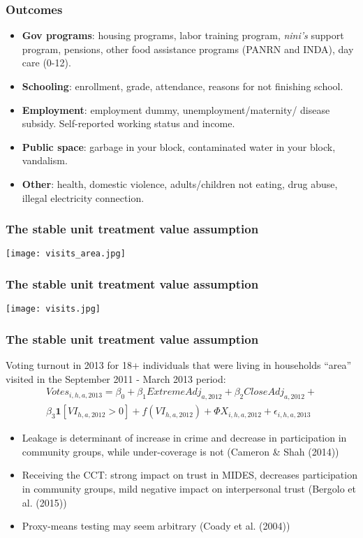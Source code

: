 \documentclass{beamer}
\begin{document}
\begin{frame}
\frametitle{Outcomes}
\begin{itemize}
	\item \textbf{Gov programs}: housing programs, labor training program, \textit{nini's} support program, pensions, other food assistance programs (PANRN and INDA), day care (0-12).
	\item \textbf{Schooling}: enrollment, grade, attendance, reasons for not finishing school. 	 
	\item \textbf{Employment}: employment dummy, unemployment/maternity/ disease subsidy. Self-reported working status and income.
	\item \textbf{Public space}: garbage in your block, contaminated water in your block, vandalism.
	\item \textbf{Other}: health, domestic violence, adults/children not eating, drug abuse, illegal electricity connection.
\end{itemize}
\end{frame}

\begin{frame}
\frametitle{The stable unit treatment value assumption}
\begin{center}
	\texttt{[image: visits\_area.jpg]}
	\label{visits_area}
\end{center}
\end{frame}

\begin{frame}
\frametitle{The stable unit treatment value assumption}
\begin{center}
	\texttt{[image: visits.jpg]}
	\label{visits}
\end{center}
\end{frame}

\begin{frame}
\frametitle{The stable unit treatment value assumption}
Voting turnout in 2013 for 18+ individuals that were living in households ``area'' visited in the September 2011 - March 2013 period:
\begin{multline}
Votes_{i,h,a,2013} = \beta _0 + \beta_1ExtremeAdj_{a,2012} +\beta_2CloseAdj_{a,2012} + \\
\beta_3\mathbf{1}[VI_{h,a,2012}>0] + f(VI_{h,a,2012}) + \Phi X_{i,h,a,2012} + \epsilon_{i,h,a,2013}
\end{multline}
\begin{itemize}
	\item Leakage is determinant of increase in crime and decrease in participation in community groups, while under-coverage is not (Cameron \& Shah (2014))
	\item Receiving the CCT: strong impact on trust in MIDES, decreases participation in community groups, mild negative impact on interpersonal trust (Bergolo et al. (2015))
	\item Proxy-means testing may seem arbitrary (Coady et al. (2004))
\end{itemize}

\end{frame}	
	
\end{document}
